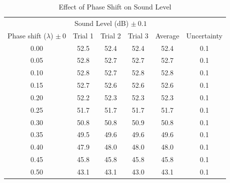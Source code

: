 \documentclass[index]{subfiles}
\begin{document}
\begin{table}[H]
    \caption{Effect of Phase Shift on Sound Level}
    \centering
    \begin{tabular}{@{}cccccc@{}} \toprule
                                             & \multicolumn{3}{c}{Sound Level (dB) \(\pm\ 0.1\)}                                             \\ \cmidrule(r){2-4}
        Phase shift (\(\lambda\)) \(\pm\ 0\) & Trial 1                                           & Trial 2 & Trial 3 & Average & Uncertainty \\ \midrule
        0.00                                 & 52.5                                              & 52.4    & 52.4    & 52.4    & 0.1         \\
        0.05                                 & 52.8                                              & 52.7    & 52.7    & 52.7    & 0.1         \\
        0.10                                 & 52.8                                              & 52.7    & 52.8    & 52.8    & 0.1         \\
        0.15                                 & 52.7                                              & 52.6    & 52.6    & 52.6    & 0.1         \\
        0.20                                 & 52.2                                              & 52.3    & 52.3    & 52.3    & 0.1         \\
        0.25                                 & 51.7                                              & 51.7    & 51.7    & 51.7    & 0.1         \\
        0.30                                 & 50.8                                              & 50.8    & 50.9    & 50.8    & 0.1         \\
        0.35                                 & 49.5                                              & 49.6    & 49.6    & 49.6    & 0.1         \\
        0.40                                 & 47.9                                              & 48.0    & 48.0    & 48.0    & 0.1         \\
        0.45                                 & 45.8                                              & 45.8    & 45.8    & 45.8    & 0.1         \\
        0.50                                 & 43.1                                              & 43.1    & 43.0    & 43.1    & 0.1         \\

\end{tabular}
\end{table}
\end{document}

